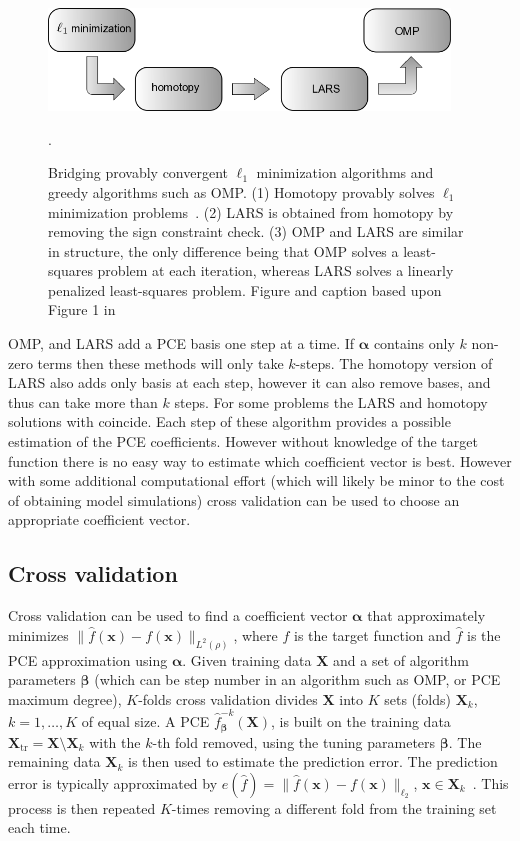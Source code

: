 \begin{figure}[h]
\centering
\includegraphics[width=0.95\textwidth]{images/compressed-sensing-hierarchy.png}
\caption{Bridging provably convergent $\ell_1$ minimization algorithms and greedy 
algorithms such as OMP. (1) Homotopy provably solves $\ell_1$ minimization 
problems~\cite{Efron2004}. (2) LARS is obtained from homotopy by removing
the sign constraint check. (3) OMP and LARS are similar in structure, 
the only difference being that OMP solves a least-squares problem at each iteration,
whereas LARS solves a linearly penalized least-squares problem. 
Figure and caption based upon Figure 1 in~\cite{Donoho2008}}. 
\label{fig:compressed-sensing-method-heirarchy}
\end{figure}

OMP, and LARS add a PCE basis one step at a time. If $\boldsymbol{\alpha}$ contains
 only $k$ non-zero terms then these methods will only take $k$-steps. 
The homotopy version of LARS also adds only basis at each step, however 
it can also remove bases, and thus can take more than $k$ steps. For some problems 
the LARS and homotopy solutions with coincide. Each step of these algorithm provides a possible
estimation of the PCE coefficients. However without knowledge of the target function there is no
easy way to estimate which coefficient vector is best. However with some additional computational 
effort (which will likely be minor to the cost of obtaining model simulations) cross validation 
can be used to choose an appropriate coefficient vector.

\subsection{Cross validation}
Cross validation can be used to find a coefficient vector $\boldsymbol{\alpha}$ 
that approximately minimizes $\| \hat{f}(\mathbf{x})-f(\mathbf{x})\|_{L^2(\rho)}$, where
$f$ is the target function and $\hat{f}$ is the PCE approximation using $\boldsymbol{\alpha}$. 
Given training data $\mathbf{X}$ and a set of algorithm parameters $\boldsymbol{\beta}$ (which can be step number in an 
algorithm such as OMP, or PCE maximum degree), $K$-folds cross validation divides 
$\mathbf{X}$ into $K$ sets (folds) $\mathbf{X}_k$, $k=1,\ldots,K$ of equal size. 
A PCE $\hat{f}^{-k}_{\boldsymbol{\beta}}(\mathbf{X})$, is built on the training data 
$\mathbf{X}_{\mathrm{tr}}=\mathbf{X} \setminus \mathbf{X}_k$ 
with the $k$-th fold removed, using the tuning parameters $\boldsymbol{\beta}$. 
The remaining data $\mathbf{X}_k$ is then used to estimate the prediction error.
The prediction error is typically approximated by
$e(\hat{f})=\lVert \hat{f}(\mathbf{x})-f(\mathbf{x})\rVert_{\ell_2}$, 
$\mathbf{x}\in\mathbf{X}_{k}$~\cite{hastie2001}. This process is then repeated $K$-times removing a 
different fold from the training set each time. 

